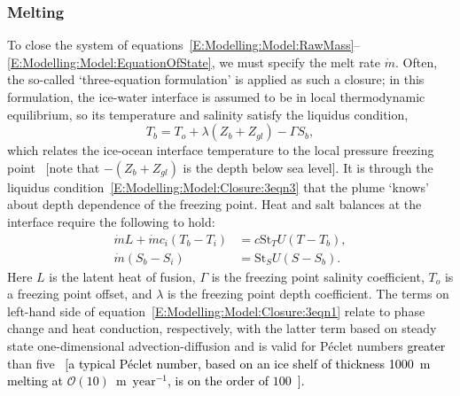 \documentclass[openacc]{rsproca_new}%
\newcommand{\order}[1]{\mathcal{O}(#1)}
\newcommand{\red}[1]{{\color{red} #1}}
\newcommand{\blue}[1]{{\color{blue} #1}}
\newcommand{\rout}[1]{\red{\st{#1}}}\newcommand{\ab}[1]{\textcolor{Green}{#1}}\newcommand{\about}[1]{\textcolor{Cyan}{\sout{#1}}}
\renewcommand{\rout}[1]{{}} %
\renewcommand{\blue}[1]{{\textcolor{black}{#1}}} %
\renewcommand{\red}[1]{{}} %
\begin{document}
\begin{table}[!h]
\begin{center}
\begin{tabular}{llll}
\hline
\end{tabular}
\end{center}
\vspace*{-4pt}
\end{table}

\subsubsection{Melting}
To close the system of equations~\eqref{E:Modelling:Model:RawMass}--\eqref{E:Modelling:Model:EquationOfState}, we must specify the melt rate $\dot{m}$.  Often, the so-called `three-equation formulation' is applied as such a closure; in this formulation, the ice-water interface is assumed to be in local thermodynamic equilibrium, so its temperature and salinity satisfy the liquidus condition,
\begin{equation}
    T_b = T_o + \lambda (Z_{b} + Z_{gl}) - \Gamma S_b,\label{E:Modelling:Model:Closure:3eqn3}
\end{equation}
which relates the ice-ocean interface temperature to the local pressure freezing point~\cite{Holland1999JPhysOcean} [note that $-(Z_b + Z_{gl})$ is the depth below sea level]. It is through the liquidus condition~\eqref{E:Modelling:Model:Closure:3eqn3} that the plume `knows' about depth dependence of the freezing point. Heat and salt balances at the interface require the following to hold:
\begin{align}
\dot{m}L + \dot{m}c_i (T_b - T_i) &= c \mathrm{St}_T U(T - T_b),\label{E:Modelling:Model:Closure:3eqn1}\\
\dot{m}(S_b - S_i) &= \mathrm{St}_S U(S - S_b).\label{E:Modelling:Model:Closure:3eqn2}
\end{align}  
Here\rout{ $c, c_i$ are the specific heat capacities of water and ice, respectively,} $L$ is the latent heat of fusion, $\Gamma$ is the freezing point salinity coefficient,  $T_o$ is a freezing point offset, and $\lambda$ is the freezing point depth coefficient. The terms on left-hand side of equation~\eqref{E:Modelling:Model:Closure:3eqn1} relate to phase change and heat conduction, respectively, with the latter term based on steady state one-dimensional advection-diffusion and is valid for P\'{e}clet numbers\rout{ less} \blue{greater} than five~\cite{Holland1999JPhysOcean} \blue{[a typical P\'{e}clet number, based on an ice shelf of thickness 1000~m melting at $\order{10}$~m~$\text{year}^{-1}$, is on the order of $100$~\cite{Holland1999JPhysOcean}].}
\end{document}
